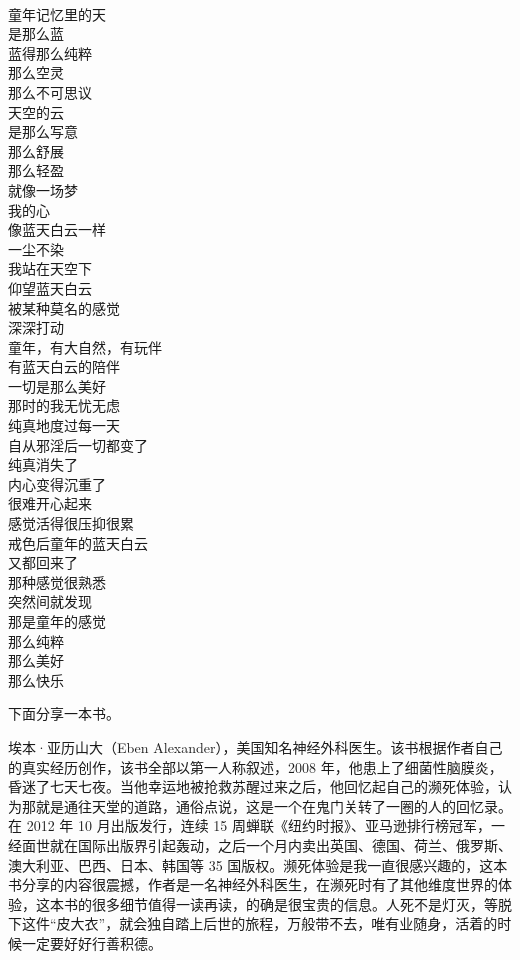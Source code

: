 \begin{poem}[童年的天空]
    \begin{multicols}{4}
        \begin{center}~\\
            童年记忆里的天 \\ 是那么蓝 \\ 蓝得那么纯粹 \\ 那么空灵 \\ 那么不可思议 \\ 天空的云 \\ 是那么写意 \\ 那么舒展 \\ 那么轻盈 \\ 就像一场梦 \\ 我的心 \\ 像蓝天白云一样 \\ 一尘不染 \\ 我站在天空下 \\ 仰望蓝天白云 \\ 被某种莫名的感觉 \\ 深深打动 \\ 童年，有大自然，有玩伴 \\ 有蓝天白云的陪伴 \\ 一切是那么美好 \\ 那时的我无忧无虑 \\ 纯真地度过每一天 \\ 自从邪淫后一切都变了 \\ 纯真消失了 \\ 内心变得沉重了 \\ 很难开心起来 \\ 感觉活得很压抑很累 \\ 戒色后童年的蓝天白云 \\ 又都回来了 \\ 那种感觉很熟悉 \\ 突然间就发现 \\ 那是童年的感觉 \\ 那么纯粹 \\ 那么美好 \\ 那么快乐
        \end{center}
    \end{multicols}
\end{poem}

下面分享一本书。

\begin{book}
    埃本·亚历山大（Eben Alexander），美国知名神经外科医生。该书根据作者自己的真实经历创作，该书全部以第一人称叙述，2008 年，他患上了细菌性脑膜炎，昏迷了七天七夜。当他幸运地被抢救苏醒过来之后，他回忆起自己的濒死体验，认为那就是通往天堂的道路，通俗点说，这是一个在鬼门关转了一圈的人的回忆录。在 2012 年 10 月出版发行，连续 15 周蝉联《纽约时报》、亚马逊排行榜冠军，一经面世就在国际出版界引起轰动，之后一个月内卖出英国、德国、荷兰、俄罗斯、澳大利亚、巴西、日本、韩国等 35 国版权。濒死体验是我一直很感兴趣的，这本书分享的内容很震撼，作者是一名神经外科医生，在濒死时有了其他维度世界的体验，这本书的很多细节值得一读再读，的确是很宝贵的信息。人死不是灯灭，等脱下这件“皮大衣”，就会独自踏上后世的旅程，万般带不去，唯有业随身，活着的时候一定要好好行善积德。
\end{book}

